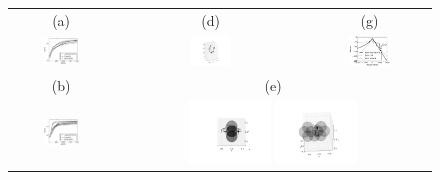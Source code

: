 \documentclass{svproc}
\begin{document}
\begin{figure}
\begin{tabular}{ccc}
(a)&(d)&(g)\\
\includegraphics[width=0.38\textwidth]{result_comparison_viapoint}&
\includegraphics[width=0.22\textwidth,clip=true,trim=165 35 165 70]{viapoints}&
\includegraphics[width=0.37\textwidth]{vary_weight_viapoint}\\
(b)&\multicolumn{2}{c}{(e)}\\
\includegraphics[width=0.38\textwidth]{result_comparison_obstacle}&
\multicolumn{2}{c}{
\includegraphics[width=0.27\textwidth,clip=true,trim=200 80 155 120]{obstacles1}
\includegraphics[width=0.27\textwidth,clip=true,trim=165 35 140 100]{obstacles2}}\\

\end{tabular}
\end{figure}
\end{document}
